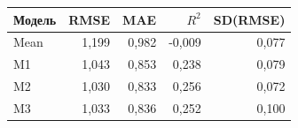 \begin{tabular}{lrrrr}
\toprule
Модель & RMSE & MAE & $R^2$ & SD(RMSE) \\
\midrule
Mean & 1,199 & 0,982 & -0,009 & 0,077 \\
M1 & 1,043 & 0,853 & 0,238 & 0,079 \\
M2 & 1,030 & 0,833 & 0,256 & 0,072 \\
M3 & 1,033 & 0,836 & 0,252 & 0,100 \\
\bottomrule
\end{tabular}
